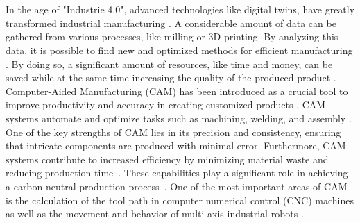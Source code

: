 \documentclass[ZLstudentexpose%
              ,optBiber%
              ,optEnglish%
              ,10pt
              ]{ZLlatex}%
\begin{document}
%
\renewcommand{\ZLlangChair}{\ZLlangGerEng{Name des Lehrstuhls (deutsch)}{Institute for Machine Tools and Industrial Management}}%
%
%

%
\section{}%


In the age of "Industrie 4.0", advanced technologies like digital twins, have greatly transformed industrial manufacturing \cite{Singh.2021}. A considerable amount of data can be gathered from various processes, like milling or 3D printing. By analyzing this data, it is possible to find new and optimized methods for efficient manufacturing \cite{Ghobakhloo.2020}. By doing so, a significant amount of resources, like time and money, can be saved while at the same time increasing the quality of the produced product \cite{Bibby.2018,Simonis.2016}.\newline
Computer-Aided Manufacturing (CAM) has been introduced as a crucial tool to improve productivity and accuracy in creating customized products \cite{Feldhausen.2022}. CAM systems automate and optimize tasks such as machining, welding, and assembly \cite{LalitNarayan.2013b}. One of the key strengths of CAM lies in its precision and consistency, ensuring that intricate components are produced with minimal error. Furthermore, CAM systems contribute to increased efficiency by minimizing material waste and reducing production time~\cite{Dubovska.2014}. These capabilities play a significant role in achieving a carbon-neutral production process~\cite{Saxena.2020}. One of the most important areas of CAM is the calculation of the tool path in computer numerical control (CNC) machines as well as the movement and behavior of multi-axis industrial robots \cite{Pan}. \newline
\end{document}
